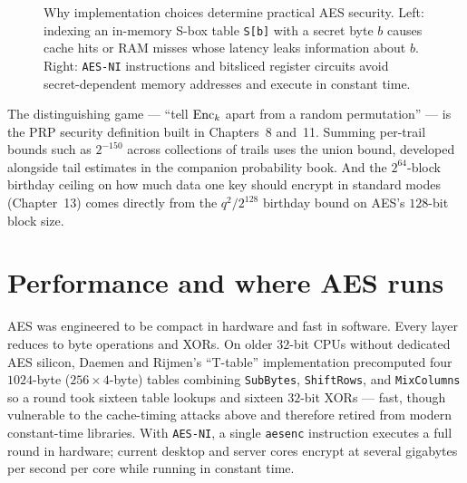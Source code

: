 \begin{figure}[htbp]
\caption{Why implementation choices determine practical AES security. Left: indexing an in-memory S-box table \texttt{S[b]} with a secret byte $b$ causes cache hits or RAM misses whose latency leaks information about $b$. Right: \texttt{AES-NI} instructions and bitsliced register circuits avoid secret-dependent memory addresses and execute in constant time.}
\label{ch12:fig-cache-timing}
\end{figure}

\begin{connectionbox}
The distinguishing game --- ``tell $\operatorname{Enc}_k$ apart from a random permutation'' ---
is the PRP security definition built in Chapters~8 and~11. Summing per-trail
bounds such as $2^{-150}$ across collections of trails uses the union bound, developed
alongside tail estimates in the companion probability book. And the $2^{64}$-block
birthday ceiling on how much data one key should encrypt in standard modes
(Chapter~13) comes directly from the $q^2/2^{128}$ birthday bound on AES's
$128$-bit block size.
\end{connectionbox}

\section{Performance and where AES runs}

AES was engineered to be compact in hardware and fast in software. Every layer
reduces to byte operations and XORs. On older $32$-bit CPUs without dedicated AES
silicon, Daemen and Rijmen's ``T-table'' implementation precomputed four
$1024$-byte ($256 \times 4$-byte) tables combining \texttt{SubBytes},
\texttt{ShiftRows}, and \texttt{MixColumns} so a round took sixteen table lookups
and sixteen $32$-bit XORs --- fast, though vulnerable to the cache-timing attacks
above and therefore retired from modern constant-time libraries. With \texttt{AES-NI},
a single \texttt{aesenc} instruction executes a full round in hardware; current
desktop and server cores encrypt at several gigabytes per second per core while
running in constant time.


